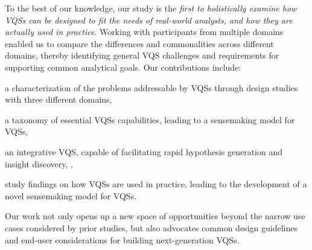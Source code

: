  \par To the best of our knowledge, our study is the \emph{first to holistically examine how VQSs can be designed to fit the needs of real-world analysts, and how they are actually used in practice}. Working with participants from multiple domains enabled us to compare the differences and commonalities across different domains, thereby identifying general VQS challenges and requirements for supporting common analytical goals. Our contributions include:
 \begin{denselist}
 \item a characterization of the problems addressable by VQSs through design studies with three different domains,
 \item a taxonomy of essential VQSs capabilities, leading to a sensemaking model for VQSs, %
 \item an integrative VQS, \zvpp{} capable of facilitating rapid hypothesis generation and insight discovery, , 
 \item study findings on how VQSs are used in practice, leading to the development of a novel sensemaking model for VQSs. %
 \end{denselist}
 Our work not only opens up a new space of opportunities beyond the narrow use cases considered by prior studies, but also advocates common design guidelines and end-user considerations for building next-generation VQSs.